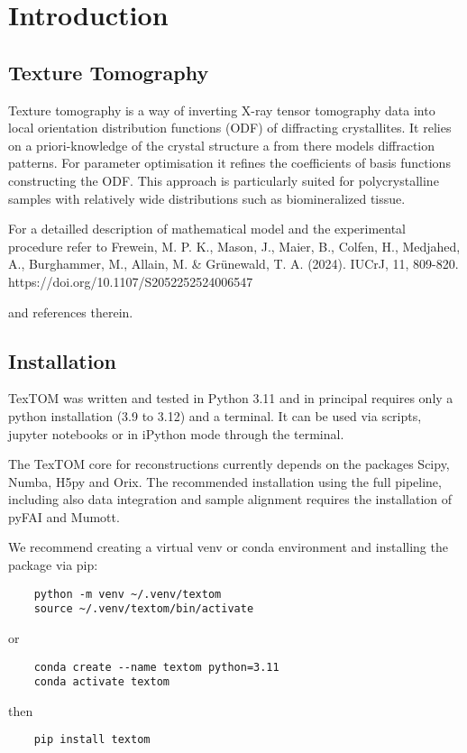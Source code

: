 \section{Introduction}

\subsection{Texture Tomography}
Texture tomography is a way of inverting X-ray tensor tomography data into local
orientation distribution functions (ODF) of diffracting crystallites.
It relies on a priori-knowledge of the crystal structure a from there
models diffraction patterns. For parameter optimisation it refines
the coefficients of basis functions constructing the ODF.
This approach is particularly suited for polycrystalline samples
with relatively wide distributions such as biomineralized tissue.

For a detailled description of mathematical model and the experimental procedure
refer to 
Frewein, M. P. K., Mason, J., Maier, B., Colfen, H., Medjahed, A., Burghammer, 
M., Allain, M. \& Grünewald, T. A. (2024). IUCrJ, 11, 809-820. https://doi.org/10.1107/S2052252524006547

and references therein.

\subsection{Installation}

TexTOM was written and tested in Python 3.11 and in principal requires only a python installation (3.9 to 3.12) and a terminal.
It can be used via scripts, jupyter notebooks or in iPython mode through the terminal.

The TexTOM core for reconstructions currently depends on the packages Scipy, Numba, H5py and Orix.
The recommended installation using the full pipeline, including also data integration and sample alignment requires the installation of pyFAI and Mumott.

We recommend creating a virtual venv or conda environment and installing the package via pip:

\begin{verbatim}
    python -m venv ~/.venv/textom
    source ~/.venv/textom/bin/activate
\end{verbatim}
or
\begin{verbatim}
    conda create --name textom python=3.11
    conda activate textom
\end{verbatim}
then
\begin{verbatim}
    pip install textom
\end{verbatim}

